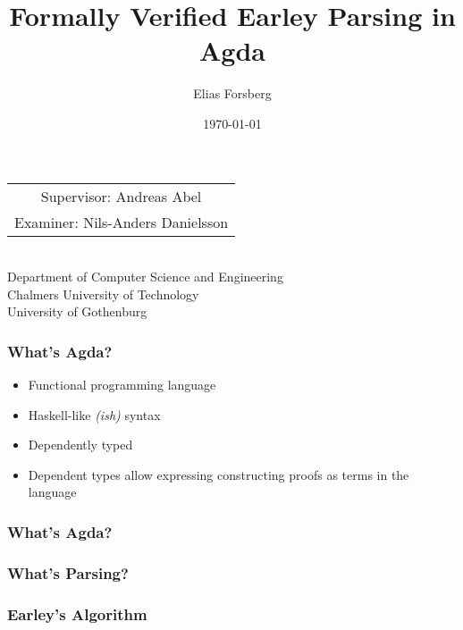 \documentclass{beamer}
\begin{document}
	\title{Formally Verified Earley Parsing in Agda}
	\author{Elias Forsberg}
	\date{\today}
	
	\begin{frame}
		\maketitle
		\centering
		\begin{tabular}{c}
			Supervisor: Andreas Abel \\ Examiner: Nils-Anders Danielsson
		\end{tabular}\\
		\flushleft
		{\tiny Department of Computer Science and Engineering\\}
		{\tiny \sc Chalmers University of Technology\\}
		{\tiny \sc University of Gothenburg\\}
	
	\end{frame}
	

	\begin{frame}
		\frametitle{What's Agda?}

		\begin{itemize}
			\item Functional programming language
			\item Haskell-like \emph{(ish)} syntax
			\item Dependently typed
			\item Dependent types allow expressing constructing proofs as terms 
				in the language
		\end{itemize}
	\end{frame}

	\begin{frame}
		\frametitle{What's Agda?}
	\end{frame}

	\begin{frame}
		\frametitle{What's Parsing?}
	\end{frame}
	
	\begin{frame}
		\frametitle{Earley's Algorithm}
	\end{frame}
\end{document}
